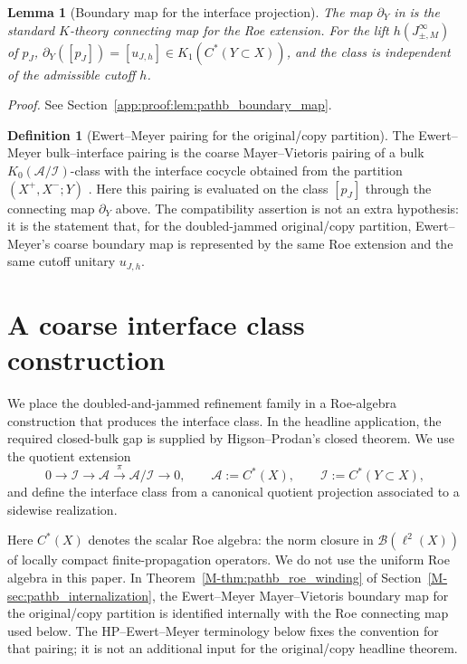 \documentclass[11pt]{article}
\numberwithin{equation}{section}
\newtheorem{lemma}[theorem]{Lemma}
\theoremstyle{definition}
\newtheorem{definition}[theorem]{Definition}
\theoremstyle{remark}
\newcommand{\proofref}[1]{%
  \par\noindent\emph{Proof.} See Section~\ref{#1}.\par\medskip
}
\newcommand{\proofappendixref}[1]{\proofref{#1}}
\begin{document}
\begin{lemma}[Boundary map for the interface projection]\label{lem:pathb_boundary_map}
The map $\partial_Y$ in  is the standard $K$-theory connecting
map for the Roe extension. For the lift $h(J_{\pm,M}^\infty)$ of $p_J$,
\(\partial_Y([p_J])=[u_{J,h}]\in K_1(C^*(Y\subset X))\), and the class is independent of the
admissible cutoff $h$.
\end{lemma}
\proofappendixref{app:proof:lem:pathb_boundary_map}

\begin{definition}[Ewert--Meyer pairing for the original/copy partition]\label{def:pathb_em_pairing}
The Ewert--Meyer bulk--interface pairing is the coarse Mayer--Vietoris pairing of a bulk
$K_0(\mathcal A/\mathcal I)$-class with the interface cocycle obtained from the partition
$(X^+,X^-;Y)$ \cite{EwertMeyer2019}. Here this pairing is evaluated on the class $[p_J]$ through
the connecting map $\partial_Y$ above. The compatibility assertion is not an extra hypothesis: it
is the statement that, for the doubled-jammed original/copy partition, Ewert--Meyer's coarse
boundary map is represented by the same Roe extension and the same cutoff unitary $u_{J,h}$.
\end{definition}


\section{A coarse interface class construction}\label{sec:bulkboundary}

We place the doubled-and-jammed refinement family in a Roe-algebra construction that produces the
interface class. In the headline application, the required closed-bulk gap is supplied by
Higson--Prodan's closed theorem. We use the
quotient extension
\[
0 \longrightarrow \mathcal I \longrightarrow \mathcal A \xrightarrow{\;\pi\;} \mathcal A/\mathcal I
\longrightarrow 0,
\qquad
\mathcal A:=C^*(X),
\qquad
\mathcal I:=C^*(Y\subset X),
\]
and define the interface class from a canonical quotient projection associated to a sidewise
realization.

Here \(C^*(X)\) denotes the scalar Roe algebra: the norm closure in
\(\mathcal B(\ell^2(X))\) of locally compact finite-propagation operators. We do not use the
uniform Roe algebra in this paper. In Theorem~\ref{M-thm:pathb_roe_winding} of
Section~\ref{M-sec:pathb_internalization}, the Ewert--Meyer Mayer--Vietoris boundary map for the
original/copy partition is identified internally with the Roe connecting map used below. The
HP--Ewert--Meyer terminology below fixes the convention for that pairing; it is not an additional
input for the original/copy headline theorem.
\end{document}
